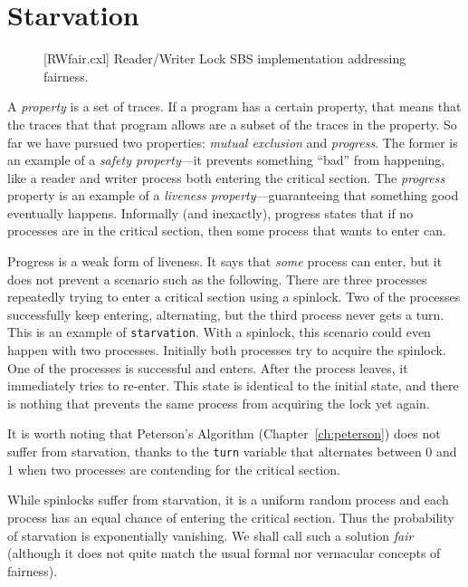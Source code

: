 \documentclass{report}
\newenvironment{code}{
\tcolorbox
}{
\endtcolorbox
}
\begin{document}
\chapter{Starvation}
\label{ch:starvation}

\begin{figure}
\begin{code}
{\small
{}
}
\end{code}
\caption{[RWfair.cxl] Reader/Writer Lock SBS implementation addressing fairness.}
\label{fig:RWfair}
\end{figure}

A \emph{property}
is a set of traces.
If a program has a certain property, that means that the traces that that
program allows are a subset of the traces in the property.
So far we have pursued two properties: \emph{mutual exclusion}
and \emph{progress}.  The former is an example of a
\emph{safety property}---it prevents something ``bad'' from
happening, like a reader and writer process both entering the
critical section.  The \emph{progress} property is an example
of a \emph{liveness property}---guaranteeing that something good
eventually happens.
Informally (and inexactly), progress states that if no processes
are in the critical section, then some process that wants to enter
can.

Progress is a weak form of liveness.  It says that \emph{some}
process can enter, but it does not prevent a scenario such as
the following.  There are three processes repeatedly trying to
enter a critical section using a spinlock.  Two of
the processes successfully keep entering, alternating, but the third
process never gets a turn.  This is an example of
\texttt{starvation}.  With a spinlock, this scenario could
even happen with two processes.  Initially both processes
try to acquire the spinlock.  One of the processes is
successful and enters.  After the process leaves, it immediately
tries to re-enter.  This state is identical to the initial
state, and there is nothing that prevents the same process
from acquiring the lock yet again.

It is worth noting that Peterson's Algorithm (Chapter~\ref{ch:peterson})
does not suffer from starvation, thanks to the \texttt{turn} variable
that alternates between 0 and 1 when two processes are contending for
the critical section.

While spinlocks suffer from starvation, it is a uniform random
process and each process has an equal chance of entering the critical
section.  Thus the probability of starvation is exponentially vanishing.
We shall call such a solution \emph{fair}
(although it does not quite
match the usual formal nor vernacular concepts of fairness).
\end{document}
